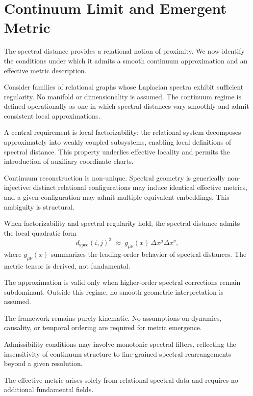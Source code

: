 \section{Continuum Limit and Emergent Metric}
  \label{sec:continuum-limit-and-emergent-metric}

  The spectral distance provides a relational notion of proximity.
  We now identify the conditions under which it admits a smooth continuum
  approximation and an effective metric description.

  Consider families of relational graphs whose Laplacian spectra exhibit
  sufficient regularity.
  No manifold or dimensionality is assumed.
  The continuum regime is defined operationally as one in which spectral
  distances vary smoothly and admit consistent local approximations.

  A central requirement is local factorizability:
  the relational system decomposes approximately into weakly coupled
  subsystems, enabling local definitions of spectral distance.
  This property underlies effective locality and permits the introduction
  of auxiliary coordinate charts.

  Continuum reconstruction is non-unique.
  Spectral geometry is generically non-injective:
  distinct relational configurations may induce identical effective metrics,
  and a given configuration may admit multiple equivalent embeddings.
  This ambiguity is structural.

  When factorizability and spectral regularity hold,
  the spectral distance admits the local quadratic form
  \begin{equation}
    d_{\mathrm{spec}}(i,j)^2
    \;\approx\;
    g_{\mu\nu}(x)\,\Delta x^\mu \Delta x^\nu ,
  \end{equation}
  where $g_{\mu\nu}(x)$ summarizes the leading-order behavior of
  spectral distances.
  The metric tensor is derived, not fundamental.

  The approximation is valid only when higher-order spectral corrections
  remain subdominant.
  Outside this regime, no smooth geometric interpretation is assumed.

  The framework remains purely kinematic.
  No assumptions on dynamics, causality, or temporal ordering are required
  for metric emergence.

  

  Admissibility conditions may involve monotonic spectral filters,
  reflecting the insensitivity of continuum structure to
  fine-grained spectral rearrangements beyond a given resolution.

  The effective metric arises solely from relational spectral data
  and requires no additional fundamental fields.

